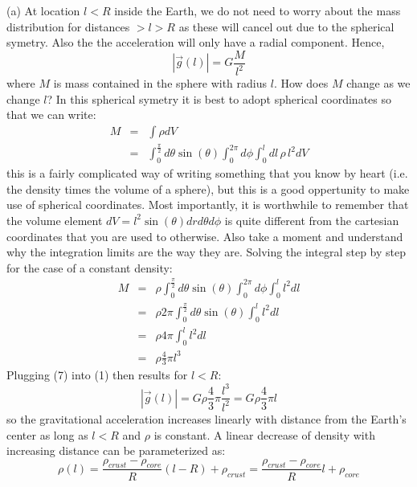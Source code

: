 \documentclass[a4paper,12pt]{article}
\begin{document}
    \noindent (a) At location $l<R$ inside the Earth, we do not need to worry about the mass distribution for distances $>l>R$ as these will cancel out due to the spherical symetry. Also the the acceleration will only have a radial component. Hence,
    \begin{equation}
        |\vec{g}(l)| = G\frac{M}{l^2}
    \end{equation}
    where $M$ is mass contained in the sphere with radius $l$. How does $M$ change as we change $l$? In this spherical symetry it is best to adopt spherical coordinates so that we can write: 
    \begin{eqnarray}
    M &=& \int \rho dV \\ 
    &=& \int_0^{\frac{\pi}{2}} d\theta \sin(\theta) \int_0^{2\pi}  d\phi \int_0^l dl\,\rho\,l^2 dV
    \end{eqnarray}
    this is a fairly complicated way of writing something that you know by heart (i.e. the density times the volume of a sphere), but this is a good oppertunity to make use of spherical coordinates. Most importantly, it is worthwhile to remember that the volume element $dV = l^2 \sin(\theta)drd\theta d\phi$ is quite different from the cartesian coordinates that you are used to otherwise. Also take a moment and understand why the integration limits are the way they are. Solving the integral step by step for the case of a constant density:
    \begin{eqnarray}
        M &=& \rho \int_0^{\frac{\pi}{2}} d\theta \sin(\theta)\int_0^{2\pi}  d\phi \int_0^l l^2 dl \\
         &=&\rho 2\pi \int_0^{\frac{\pi}{2}} d\theta \sin(\theta)\int_0^l l^2dl\\
         &=&\rho 4\pi \int_0^l l^2dl \\ 
         &=&\rho \frac{4}{3}\pi l^3
    \end{eqnarray}
    Plugging (7) into (1) then results for $l<R$:
    \begin{equation}
        |\vec{g}(l)| = G  \rho \frac{4}{3}\pi \frac{l^3}{l^2} = G  \rho \frac{4}{3}\pi l
    \end{equation}
    so the gravitational acceleration increases linearly with distance from the Earth's center as long as $l<R$ and $\rho$ is constant. A linear decrease of density with increasing distance can be parameterized as:
    \begin{equation}
        \rho(l) = \frac{\rho_{crust}-\rho_{core}}{R} (l-R) + \rho_{crust} = \frac{\rho_{crust} - \rho_{core}}{R}l+\rho_{core}
    \end{equation}
\end{document}
